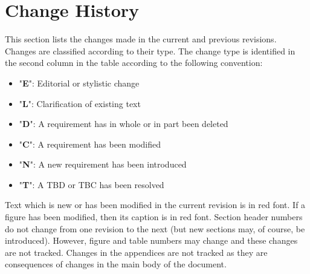 \documentclass{pnp_article}
\begin{document}




\tableofcontents
\listoffigures
\listoftables


\section{Change History}

This section lists the changes made in the current and previous revisions. Changes are classified according to their type. The change type is identified in the second column in the table according to the following convention:

\begin{itemize}
\item "\textbf{E}": Editorial or stylistic change
\item "\textbf{L}": Clarification of existing text
\item "\textbf{D}": A requirement has in whole or in part been deleted
\item "\textbf{C}": A requirement has been modified
\item "\textbf{N}": A new requirement has been introduced
\item "\textbf{T}": A TBD or TBC has been resolved
\end{itemize}

Text which is new or has been modified in the current revision is in red font. If a figure has been modified, then its caption is in red font. Section header numbers do not change from one revision to the next (but new sections may, of course, be introduced). However, figure and table numbers may change and these changes are not tracked. Changes in the appendices are not tracked as they are consequences of changes in the main body of the document.
\end{document}
